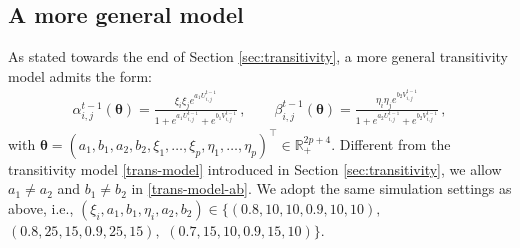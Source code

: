 \documentclass[12pt]{article}
\newcommand{\btheta}{\boldsymbol \theta}
\def\T{{\scriptscriptstyle \top} }
\newcommand{\0}{{\bf 0}}
\begin{document}
\begin{minipage}{1\linewidth}
\begin{table}[H]
	\caption{The means and  STDs (in parenthesis) of rMAEs for estimating parameters in the transitivity model (\ref{trans-model}) with $n = 100$  and $p = 500$ over 100 replications. \label{table:1}}
    \vspace{-0.5cm}
	\begin{center}
\end{center}
\end{table}
  \end{minipage}

\subsection{A more general model}
\label{sec:more.gen.model}



As stated towards the end of Section \ref{sec:transitivity},
 a more general transitivity model admits the form:
\begin{align} \label{trans-model-ab}
    \alpha_{i,j}^{t-1}(\btheta) = \frac{\xi_i \xi_je^{a_1 U_{i,j}^{t-1}} }{1+ e^{a_1 U_{i,j}^{t-1}}+ e^{b_1 V_{i,j}^{t-1}}}\,,
    \qquad \beta_{i,j}^{t-1}(\btheta) =\frac{ \eta_i \eta_j e^{b_2 V_{i,j}^{t-1}}  }{1+ e^{a_2 U_{i,j}^{t-1}}+ e^{b_2 V_{i,j}^{t-1}}}\,,
\end{align}
with $\btheta=(a_1, b_1, a_2, b_2,\xi_1,\ldots,\xi_p, \eta_1,\ldots,\eta_p)^{\T}\in\mathbb{R}_+^{2p+4}$. Different from the transitivity model \eqref{trans-model} introduced in Section \ref{sec:transitivity}, we allow $a_1\neq a_2$ and $b_1\neq b_2$ in \eqref{trans-model-ab}. We adopt the same simulation settings as above, i.e., 
$(\xi_i,  a_1, b_1, \eta_i, a_2, b_2) \in \{(0.8,10,10, 0.9,10,10),$ $(0.8,25,15, 0.9,25,15),$ $(0.7,15,10,0.9,15,10)\}$. 
\end{document}
